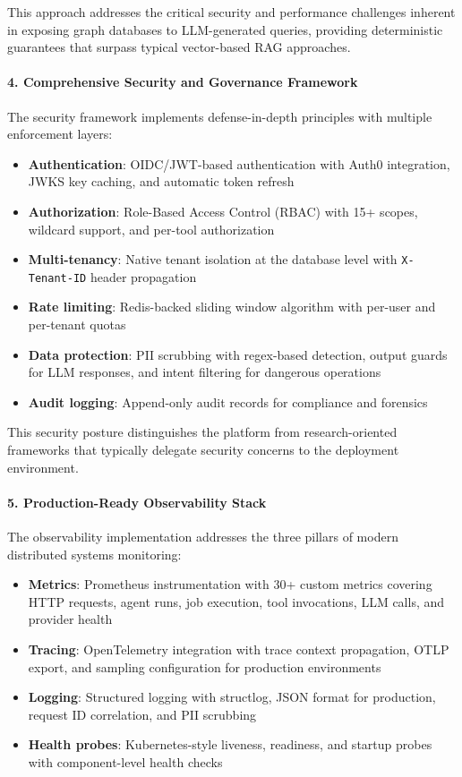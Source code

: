 This approach addresses the critical security and performance challenges inherent in exposing graph databases to LLM-generated queries, providing deterministic guarantees that surpass typical vector-based RAG approaches.

\paragraph{4. Comprehensive Security and Governance Framework}

The security framework implements defense-in-depth principles with multiple enforcement layers:

\begin{itemize}
    \item \textbf{Authentication}: OIDC/JWT-based authentication with Auth0 integration, JWKS key caching, and automatic token refresh
    \item \textbf{Authorization}: Role-Based Access Control (RBAC) with 15+ scopes, wildcard support, and per-tool authorization
    \item \textbf{Multi-tenancy}: Native tenant isolation at the database level with \texttt{X-Tenant-ID} header propagation
    \item \textbf{Rate limiting}: Redis-backed sliding window algorithm with per-user and per-tenant quotas
    \item \textbf{Data protection}: PII scrubbing with regex-based detection, output guards for LLM responses, and intent filtering for dangerous operations
    \item \textbf{Audit logging}: Append-only audit records for compliance and forensics
\end{itemize}

This security posture distinguishes the platform from research-oriented frameworks that typically delegate security concerns to the deployment environment.

\paragraph{5. Production-Ready Observability Stack}

The observability implementation addresses the three pillars of modern distributed systems monitoring:

\begin{itemize}
    \item \textbf{Metrics}: Prometheus instrumentation with 30+ custom metrics covering HTTP requests, agent runs, job execution, tool invocations, LLM calls, and provider health
    \item \textbf{Tracing}: OpenTelemetry integration with trace context propagation, OTLP export, and sampling configuration for production environments
    \item \textbf{Logging}: Structured logging with structlog, JSON format for production, request ID correlation, and PII scrubbing
    \item \textbf{Health probes}: Kubernetes-style liveness, readiness, and startup probes with component-level health checks
\end{itemize}


